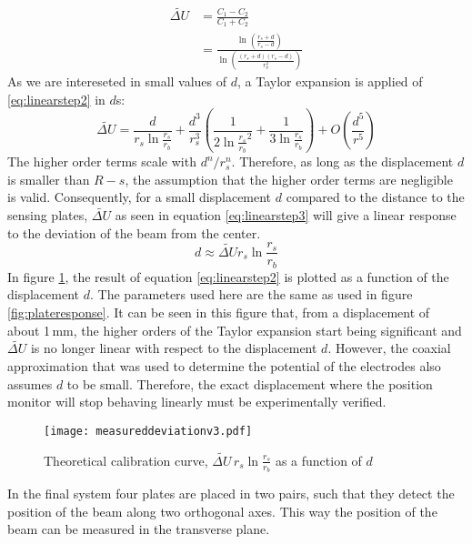 \begin{align}
\widetilde{\Delta U} &= \frac{C_1-C_2}{C_1+C_2} \nonumber \\
&= \frac{\ln\left(\frac{r_s+d}{r_s-d}\right)}{\ln\left(\frac{(r_s+d)(r_s-d)}{r_b^2}\right)}\label{eq:linearstep2}
\end{align}
As we are intereseted in small values of $d$, a Taylor expansion is applied of \ref{eq:linearstep2} in $d$s:
\begin{equation}
\widetilde{\Delta U}=\frac{d}{r_s\ln\frac{r_s}{r_b}} + \frac{d^3}{r_s^3}\left(\frac{1}{2\ln\frac{r_s}{r_b}^2}+\frac{1}{3\ln\frac{r_s}{r_b}}\right)+O(\frac{d^5}{r^5}) \label{eq:linearstep3}
\end{equation}
The higher order terms scale with $d^n/r_s^n$. Therefore, as long as the displacement $d$ is smaller than $R-s$, the assumption that the higher order terms are negligible is valid. Consequently, for a small displacement $d$ compared to the distance to the sensing plates, $\widetilde{\Delta U}$ as seen in equation \ref{eq:linearstep3} will give a linear response to the deviation of the beam from the center.
\begin{equation}
d\approx\widetilde{\Delta U}r_s\ln\frac{r_s}{r_b}
\label{eq:reversecal}
\end{equation}
In figure \ref{fig:measd}, the result of equation \ref{eq:linearstep2} is plotted as a function of the displacement $d$. The parameters used here are the same as used in figure \ref{fig:plateresponse}.
It can be seen in this figure that, from a displacement of about 1\,mm, the higher orders of the Taylor expansion start being significant and $\widetilde{\Delta U}$ is no longer linear with respect to the displacement $d$. However, the coaxial approximation that was used to determine the potential of the electrodes also assumes $d$ to be small. Therefore, the exact displacement where the position monitor will stop behaving linearly must be experimentally verified.
\begin{figure}[h]
\centering
\texttt{[image: measureddeviationv3.pdf]}
\caption{Theoretical calibration curve, $\widetilde{\Delta U}\,r_s\ln\frac{r_s}{r_b}$ as a function of $d$}
\label{fig:measd}
\end{figure}
In the final system four plates are placed in two pairs, such that they detect the position of the beam along two orthogonal axes. This way the position of the beam can be measured in the transverse plane.

